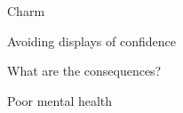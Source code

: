 \documentclass[aspectratio=169]{beamer}
\begin{document}
\begin{frame}
  \begin{center}
    \Huge Charm
    \\ \small \cite{clanceimes78}
  \end{center}
\end{frame}

\begin{frame}
  \begin{center}
    \Huge Avoiding displays of confidence
    \\ \small \cite{clanceimes78}
  \end{center}
\end{frame}

\begin{frame}
  \begin{center}
    \Huge What are the consequences?
  \end{center}
\end{frame}

\begin{frame}
  \begin{center}
    \Huge Poor mental health
    \\ \small \cite{sakulku11}
  \end{center}
\end{frame}
\end{document}
